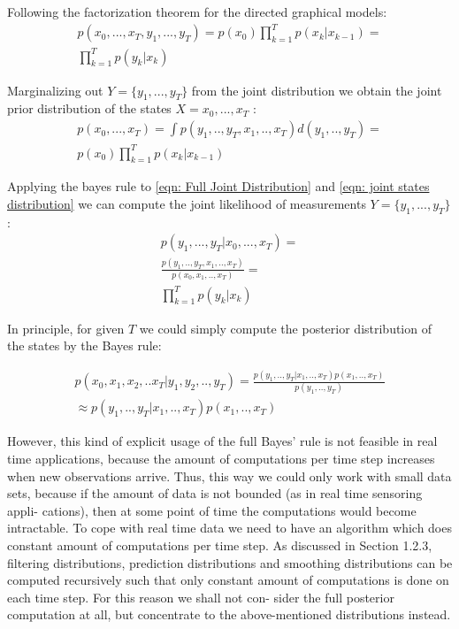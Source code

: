 Following the factorization theorem for the directed graphical models:
\begin{eqnarray} \label{eqn: Full Joint Distribution}
p(x_0 , . . . , x_T,y_1 , . . . , y_T ) = p(x_0 ) \prod_{k=1}^{T} p(x_k | x_{k-1} ) = \nonumber \\
\prod_{k=1}^{T} p(y_k | x_{k} ) 
\end{eqnarray}

Marginalizing out $Y=\{y_1 , . . . , y_T\}$ from the joint distribution we obtain
the joint prior distribution of the states $X={x_0 , . . . , x_T}$ :
\begin{eqnarray} \label{eqn: joint states distribution}
p(x_0 , . . . , x_T ) = \int p(y_1 , . . ,y_T , x_1 , . ., x_T) d(y_1 , . ., y_T) =  \nonumber \\
p(x_0 ) \prod_{k=1}^{T} p(x_k | x_{k - 1} ) 
\end{eqnarray}

Applying the bayes rule to \ref{eqn: Full Joint Distribution} and \ref{eqn: joint states distribution} we can compute the joint likelihood of measurements $Y=\{y_1 , . . . , y_T\}$:
\begin{eqnarray} \label{eqn: joint measurements likelyhood}
p(y_1 , . . . , y_T | x_0 , . . . , x_T ) = \nonumber \\
\frac{p(y_1 , . . ,y_T,x_1 , . ., x_T)}{ p(x_0,x_1 , . ., x_T)} = \nonumber \\
\prod_{k=1}^{T} p(y_k | x_k) 
\end{eqnarray}

In principle, for given $T$ we could simply compute the posterior distribution of the
states by the Bayes rule:

\begin{eqnarray}  \label{eqn: Bayes rule2}
p(x_0,x_1 , x_2 , . . x_T | y_1 , y_2 , . . ,y_T)= 
\frac{ p(y_1 , . . ,y_T | x_1 , . ., x_T )p(x_1 , . . ,x_T) } {p(y_1,..,y_T)} \nonumber \\
\approx p(y_1 , . . ,y_T | x_1 , . ., x_T  ) p(x_1 , . . ,x_T)
\end{eqnarray}

However, this kind of explicit usage of the full Bayes’ rule is not feasible in real
time applications, because the amount of computations per time step increases
when new observations arrive. Thus, this way we could only work with small data
sets, because if the amount of data is not bounded (as in real time sensoring appli-
cations), then at some point of time the computations would become intractable.
To cope with real time data we need to have an algorithm which does constant
amount of computations per time step.
As discussed in Section 1.2.3, filtering distributions, prediction distributions
and smoothing distributions can be computed recursively such that only constant
amount of computations is done on each time step. For this reason we shall not con-
sider the full posterior computation at all, but concentrate to the above-mentioned
distributions instead.


